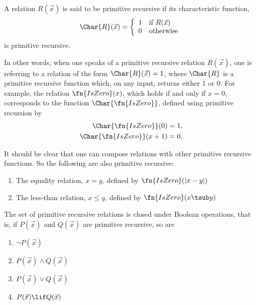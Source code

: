 \documentclass[../../../include/open-logic-section]{subfiles}
\begin{document}


\begin{defn}
A relation $R(\vec x)$ is said to be primitive recursive if its characteristic
function,
\[
\Char{R}(\vec x) = \left\{
  \begin{array}{ll}
  1 & \mbox{if $R(\vec x)$} \\
  0 & \mbox{otherwise}
  \end{array}
\right.
\]
is primitive recursive.
\end{defn}

In other words, when one speaks of a primitive recursive relation
$R(\vec x)$, one is referring to a relation of the form $\Char{R}(\vec
x) = 1$, where $\Char{R}$ is a primitive recursive function which, on
any input, returns either 1 or 0. For example, the relation
$\fn{IsZero}(x)$, which holds if and only if $x = 0$, corresponds to the
function $\Char{\fn{IsZero}}$, defined using primitive recursion by
\begin{align*}
\Char{\fn{IsZero}}(0) & = 1,\\
\Char{\fn{IsZero}}(x+1) & = 0.
\end{align*}

It should be clear that one can compose relations with other primitive
recursive functions. So the following are also primitive recursive:
\begin{enumerate}
\item The equality relation, $x = y$, defined by $\fn{IsZero}(\left|x -
  y\right|)$
\item The less-than relation, $x \leq y$, defined by $\fn{IsZero}(x
  \tsub y)$
\end{enumerate}


\begin{prop}
  The set of primitive recursive relations is closed under Boolean
  operations, that is, 
  if $P(\vec x)$ and $Q(\vec x)$ are primitive recursive, so are
  \begin{enumerate}
  \item $\lnot P(\vec x)$
  \item $P(\vec x) \land Q(\vec x)$
  \item $P(\vec x) \lor Q(\vec x)$
  \item $P(\vec x) \lif Q(\vec x)$
  \end{enumerate}
\end{prop}
\end{document}
